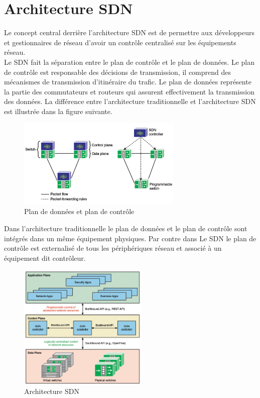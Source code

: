 
\section{Architecture SDN}

Le concept central derrière l’architecture SDN est de permettre aux développeurs et gestionnaires de réseau d’avoir un contrôle centralisé sur les équipements réseau.\\

Le SDN fait la séparation entre le plan de contrôle et le plan de données. Le plan de contrôle est responsable des décisions de transmission, il comprend des mécanismes de transmission d’itinéraire du trafic. Le plan de données représente la partie des commutateurs et routeurs qui assurent effectivement la transmission des données.  La différence entre l’architecture traditionnelle  et l’architecture SDN est illustrée dans la figure suivante.

\newpage
\begin{figure}[h]
\centering
\includegraphics[width=0.7\textwidth]{Figures/SDN_Architecture}
\decoRule
\caption{Plan de données et plan de contrôle}
\label{fig:SDN_Architecture}
\end{figure}

Dans l’architecture traditionnelle le plan de données et le plan de contrôle sont intégrés dans un même équipement physiques. Par contre dans Le SDN le plan de contrôle est externalisé de tous les périphériques réseau et associé à un équipement dit contrôleur.

\begin{figure}[h]
\centering
\includegraphics[width=0.55\textwidth]{Figures/SDN_Plans}
\decoRule
\caption{Architecture SDN}
\label{fig:SDN_Plans}
\end{figure}

